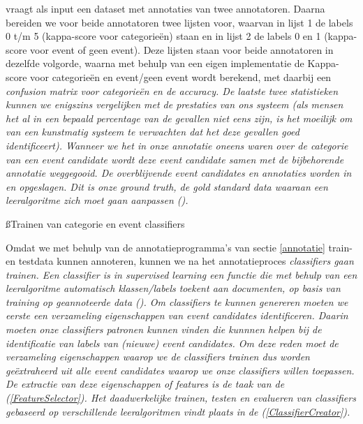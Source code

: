 {{ vraagt als input een dataset met annotaties van twee 
annotatoren. Daarna bereiden we voor beide annotatoren twee lijsten voor, 
waarvan in lijst 1 de labels 0 t/m 5 (kappa-score voor categorie\"en) staan en in 
lijst 2 de labels 0 en 1 (kappa-score voor event of geen event). Deze lijsten 
staan voor beide annotatoren in dezelfde volgorde, waarna met behulp van een eigen 
implementatie de Kappa-score voor categorie\"en en event/geen event 
wordt berekend, met daarbij een \it{confusion matrix} voor categorieën en de 
\it{accuracy}. De laatste twee statistieken kunnen we enigszins vergelijken met de prestaties van 
ons systeem (als mensen het al in een bepaald percentage van de gevallen niet 
eens zijn, is het moeilijk om van een kunstmatig systeem te verwachten dat het 
deze gevallen goed identificeert).
\vl
Wanneer we het in onze annotatie oneens waren over de categorie van een event 
candidate wordt deze event candidate samen met de bijbehorende annotatie 
weggegooid. De overblijvende event candidates en annotaties worden in 
 en 
 opgeslagen. Dit is onze \it{ground truth}, 
de \it{gold standard data} waaraan een leeralgoritme zich moet gaan aanpassen 
(\citealt{kobielus2014}).

\ss{Trainen van categorie en event classifiers}\label{train}

Omdat we met behulp van de annotatieprogramma's van sectie \ref{annotatie} train- en 
testdata kunnen annoteren, kunnen we na het annotatieproces \it{classifiers} gaan 
trainen. Een \it{classifier} is in supervised learning een functie die met behulp van 
een leeralgoritme automatisch klassen/labels toekent aan documenten, op basis 
van training op geannoteerde data (\citealt{manning2008introduction}). Om classifiers te kunnen 
genereren moeten we eerste een verzameling eigenschappen van event candidates 
identificeren. Daarin moeten onze classifiers patronen kunnen vinden die kunnnen 
helpen bij de identificatie van labels van (nieuwe) event candidates. Om deze 
reden moet de verzameling eigenschappen waarop we de classifiers trainen dus 
worden geëxtraheerd uit alle event candidates waarop we onze classifiers willen 
toepassen. De extractie van deze eigenschappen of features is de taak van de 
 (\ref{FeatureSelector}). Het daadwerkelijke trainen, testen en evalueren van 
classifiers gebaseerd op verschillende leeralgoritmen vindt plaats in de 
 (\ref{ClassifierCreator}).

}}
